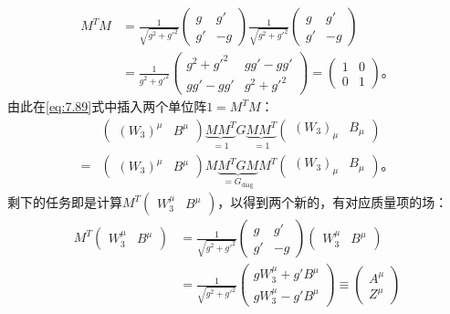 \begin{equation}
\begin{aligned}
M^TM & = \frac{1}{\sqrt{g^2+g'^2}} \begin{pmatrix}
g & g'\\ g'&-g
\end{pmatrix} \frac{1}{\sqrt{g^2+g'^2}} \begin{pmatrix}
g & g'\\ g'&-g
\end{pmatrix} \\
& = \frac{1}{g^2+g'^2} \begin{pmatrix}
g^2+g'^2 & gg'-gg'\\ gg'-gg'&g^2+g'^2
\end{pmatrix} = \begin{pmatrix}
1 & 0\\ 0 & 1
\end{pmatrix}\text{。}
\end{aligned}
\end{equation}
由此在\ref{eq:7.89}式中插入两个单位阵$1 = M^TM$：
\begin{equation}
\begin{aligned}
&\begin{pmatrix}
(W_3)^\mu & B^\mu
\end{pmatrix} \underbrace{MM^T}_{=1} G \underbrace{MM^T}_{=1} \begin{pmatrix}
(W_3)_\mu & B_\mu
\end{pmatrix} \\ =& \begin{pmatrix}
(W_3)^\mu & B^\mu
\end{pmatrix} M\underbrace{M^TGM}_{=G_\text{diag}}M^T \begin{pmatrix}
(W_3)_\mu & B_\mu
\end{pmatrix} \text{。}
\end{aligned}
\end{equation}
剩下的任务即是计算$M^T \begin{pmatrix}
W_3^\mu & B^\mu
\end{pmatrix}$，以得到两个新的，有对应质量项的场：
\begin{equation}
\begin{aligned}
M^T \begin{pmatrix}
W_3^\mu & B^\mu
\end{pmatrix} &= \frac{1}{\sqrt{g^2+g'^2}} \begin{pmatrix}
g & g'\\ g'&-g
\end{pmatrix} \begin{pmatrix}
W_3^\mu & B^\mu
\end{pmatrix} \\
& = \frac{1}{\sqrt{g^2+g'^2}} \begin{pmatrix}
gW_3^\mu + g'B^\mu \\ gW_3^\mu - g'B^\mu
\end{pmatrix} \equiv \begin{pmatrix}
A^\mu \\ Z^\mu
\end{pmatrix}
\end{aligned}
\end{equation}
